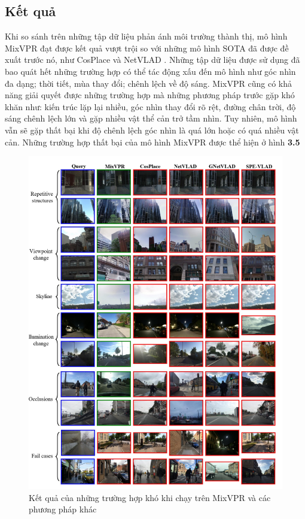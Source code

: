 \subsection{Kết quả}
Khi so sánh trên những tập dữ liệu phản ánh môi trường thành thị, mô hình MixVPR đạt được kết quả vượt trội so với những mô hình SOTA đã được đề xuất trước nó, như CosPlace \cite{berton2022rethinking} và NetVLAD \cite{arandjelovic2016netvlad}. Những tập dữ liệu được sử dụng đã bao quát hết những trường hợp có thể tác động xấu đến mô hình như góc nhìn đa dạng; thời tiết, mùa thay đổi; chênh lệch về độ sáng. MixVPR cũng có khả năng giải quyết được những trường hợp mà những phương pháp trước gặp khó khăn như: kiến trúc lặp lại nhiều, góc nhìn thay đổi rõ rệt, đường chân trời, độ sáng chênh lệch lớn và gặp nhiều vật thể cản trở tầm nhìn. Tuy nhiên, mô hình vẫn sẽ gặp thất bại khi độ chênh lệch góc nhìn là quá lớn hoặc có quá nhiều vật cản. Những trường hợp thất bại của mô hình MixVPR được thể hiện ở hình \textbf{3.5}

\begin{figure}
  \centering
  \includegraphics[width=\textwidth]{pics/Proposal/fail.png}
  \caption{Kết quả của những trường hợp khó khi chạy trên MixVPR và các phương pháp khác \cite{alibey2023mixvpr}}
\end{figure}

